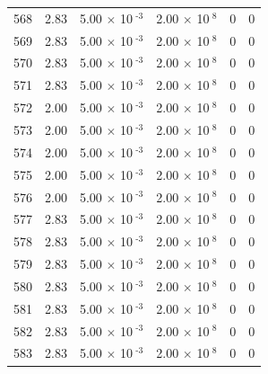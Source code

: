 \documentclass[a4paper,11pt]{article}
\begin{document}
\begin{center}
\begin{longtable}{|R{1.5cm}|R{2.4cm}|R{2.4cm}|R{2.4cm}|R{2.4cm}|R{2.4cm}|}
  568 &   2.83  &         5.00 $\times$ 10$^{\text{          -3}}$  &         2.00 $\times$ 10$^{\text{           8}}$  & 0  & 0 \\
  569 &   2.83  &         5.00 $\times$ 10$^{\text{          -3}}$  &         2.00 $\times$ 10$^{\text{           8}}$  & 0  & 0 \\
  570 &   2.83  &         5.00 $\times$ 10$^{\text{          -3}}$  &         2.00 $\times$ 10$^{\text{           8}}$  & 0  & 0 \\
  571 &   2.83  &         5.00 $\times$ 10$^{\text{          -3}}$  &         2.00 $\times$ 10$^{\text{           8}}$  & 0  & 0 \\
  572 &   2.00  &         5.00 $\times$ 10$^{\text{          -3}}$  &         2.00 $\times$ 10$^{\text{           8}}$  & 0  & 0 \\
  573 &   2.00  &         5.00 $\times$ 10$^{\text{          -3}}$  &         2.00 $\times$ 10$^{\text{           8}}$  & 0  & 0 \\
  574 &   2.00  &         5.00 $\times$ 10$^{\text{          -3}}$  &         2.00 $\times$ 10$^{\text{           8}}$  & 0  & 0 \\
  575 &   2.00  &         5.00 $\times$ 10$^{\text{          -3}}$  &         2.00 $\times$ 10$^{\text{           8}}$  & 0  & 0 \\
  576 &   2.00  &         5.00 $\times$ 10$^{\text{          -3}}$  &         2.00 $\times$ 10$^{\text{           8}}$  & 0  & 0 \\
  577 &   2.83  &         5.00 $\times$ 10$^{\text{          -3}}$  &         2.00 $\times$ 10$^{\text{           8}}$  & 0  & 0 \\
  578 &   2.83  &         5.00 $\times$ 10$^{\text{          -3}}$  &         2.00 $\times$ 10$^{\text{           8}}$  & 0  & 0 \\
  579 &   2.83  &         5.00 $\times$ 10$^{\text{          -3}}$  &         2.00 $\times$ 10$^{\text{           8}}$  & 0  & 0 \\
  580 &   2.83  &         5.00 $\times$ 10$^{\text{          -3}}$  &         2.00 $\times$ 10$^{\text{           8}}$  & 0  & 0 \\
  581 &   2.83  &         5.00 $\times$ 10$^{\text{          -3}}$  &         2.00 $\times$ 10$^{\text{           8}}$  & 0  & 0 \\
  582 &   2.83  &         5.00 $\times$ 10$^{\text{          -3}}$  &         2.00 $\times$ 10$^{\text{           8}}$  & 0  & 0 \\
  583 &   2.83  &         5.00 $\times$ 10$^{\text{          -3}}$  &         2.00 $\times$ 10$^{\text{           8}}$  & 0  & 0 \\

\end{longtable}
\end{center}
\end{document}
